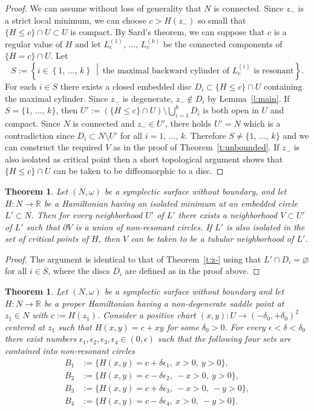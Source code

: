 \documentclass[10pt]{amsart}
\newtheorem{theo}[cdrthm]{Theorem}
\theoremstyle{definition}
\newcommand{\R}{\mathbb{R}}
\newcommand{\p}{\partial}
\begin{document}
\begin{proof}
We can assume without loss of generality that $N$ is connected. Since $z_-$ is a strict local minimum, we can choose $c>H(z_-)$ so small that $\{H\leq c\}\cap U\subset U$ is compact. By Sard's theorem, we can suppose that $c$ is a regular value of $H$ and let $L_c^{(1)},\,\ldots,\,L_c^{(k)}$ be the connected components of $\{H=c\}\cap U$. Let
\[
S:=\left\{i\in \left\{1,\,\ldots,\,k\right\}\ \middle|\ \text{the maximal backward cylinder of $L_c^{(i)}$ is resonant}\right\}.
\]
For each $i\in S$ there exists a closed embedded disc $D_i\subset \{H\leq c\}\cap U$ containing the maximal cylinder. Since $z_-$ is degenerate, $z_-\notin D_i$ by Lemma~\ref{l:main}. If $S=\{1,\,\ldots,\,k\}$, then $U':=(\{H\leq c\}\cap U)\setminus\bigcup_{i=1}^kD_i$ is both open in $U$ and compact. Since $N$ is connected and $z_-\in U'$, there holds $U'=N$ which is a contradiction since $D_i\subset N\setminus U'$ for all $i=1,\,\ldots,\,k$. Therefore $S\neq\{1,\,\ldots,\,k\}$ and we can construct the required $V$ as in the proof of Theorem~\ref{t:unbounded}. If $z_-$ is also isolated as critical point then a short topological argument shows that $\{H\leq c\}\cap U$ can be taken to be diffeomorphic to a disc.
\end{proof}

\begin{theo}\label{t:L'}
Let $(N,\omega)$ be a symplectic surface without boundary, and let $H:N\to\R$ be a Hamiltonian having an isolated minimum at an embedded circle $L'\subset N$. Then for every neighborhood $U'$ of $L'$ there exists a neighborhood $V\subset U'$ of $L'$ such that $\p V$ is a union of non-resonant circles. If $L'$ is also isolated in the set of critical points of $H$, then $V$ can be taken to be a tubular neighborhood of $L'$.
\end{theo}

\begin{proof}
The argument is identical to that of Theorem~\ref{t:z-} using that $L'\cap D_i=\varnothing$ for all $i\in S$, where the discs $D_i$ are defined as in the proof above.
\end{proof}

\begin{theo}\label{t:ultimo}
Let $(N,\omega)$ be a symplectic surface without boundary and let $H:N\to\R$ be a proper Hamiltonian having a non-degenerate saddle point at $z_1\in N$ with $c:=H(z_1)$. Consider a positive chart $(x,y):U\to (-\delta_0,+\delta_0)^2$ centered at $z_1$ such that $H(x,y)=c+xy$ for some $\delta_0>0$. For every $\epsilon<\delta<\delta_0$ there exist numbers $\epsilon_1,\epsilon_2,\epsilon_3,\epsilon_4\in(0,\epsilon)$ such that the following four sets are contained into non-resonant circles
\begin{align*}
B_1&:=\big\{ H(x,y)=c+\delta\epsilon_1,\ x>0,\ y>0\big\},\\
B_2&:=\big\{ H(x,y)=c-\delta\epsilon_2,\ -x>0,\ y>0\big\},\\
B_3&:=\big\{ H(x,y)=c+\delta\epsilon_3,\ -x>0,\ -y>0\big\},\\
B_4&:=\big\{ H(x,y)=c-\delta\epsilon_4,\ x>0,\ -y>0\big\}.
\end{align*}
\end{theo}
\end{document}
